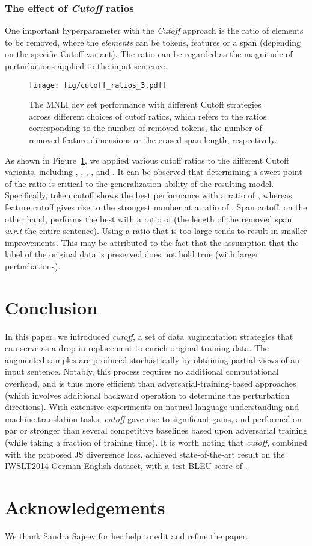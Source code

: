 \documentclass[11pt,a4paper]{article}
\begin{document}
\subsubsection{The effect of \emph{Cutoff} ratios}
\vspace{-1mm}
One important hyperparameter with the \emph{Cutoff} approach is the ratio of elements to be removed, where the \emph{elements} can be tokens, features or a span (depending on the specific Cutoff variant). The ratio can be regarded as the magnitude of perturbations applied to the input sentence.

\begin{figure} [ht!]
	\centering
	\texttt{[image: fig/cutoff\_ratios\_3.pdf]} 
	\vspace{-2mm}
	\caption{The MNLI dev set performance with different Cutoff strategies across different choices of cutoff ratios, which refers to the ratios corresponding to the number of removed tokens, the number of removed feature dimensions or the erased span length, respectively.}
	\label{fig:cutoff_ratios}
	\vspace{-2mm}
\end{figure}

As shown in Figure~\ref{fig:cutoff_ratios}, we applied various cutoff ratios to the different Cutoff variants, including , , , ,  and . It can be observed that determining a sweet point of the ratio is critical to the generalization ability of the resulting model. Specifically, token cutoff shows the best performance with a ratio of , whereas feature cutoff gives rise to the strongest number at a ratio of . Span cutoff, on the other hand, performs the best with a ratio of  (the length of the removed span \emph{w.r.t} the entire sentence). Using a ratio that is too large tends to result in smaller improvements. This may be attributed to the fact that the assumption that the label of the original data is preserved does not hold true (with larger perturbations).



\section{Conclusion}
\vspace{-2mm}
In this paper, we introduced \emph{cutoff}, a set of data augmentation strategies that can serve as a drop-in replacement to enrich original training data. The augmented samples are produced stochastically by obtaining partial views of an input sentence. Notably, this process requires no additional computational overhead, and is thus more efficient than adversarial-training-based approaches (which involves additional backward operation to determine the perturbation directions). With extensive experiments on natural language understanding and machine translation tasks, \emph{cutoff} gave rise to significant gains, and performed on par or stronger than several competitive baselines based upon adversarial training (while taking a fraction of training time). It is worth noting that \emph{cutoff}, combined with the proposed JS divergence loss, achieved state-of-the-art result on the IWSLT2014 German-English dataset, with a test BLEU score of .

\section*{Acknowledgements}
We thank Sandra Sajeev for her help to edit and refine the paper. 



\end{document}
